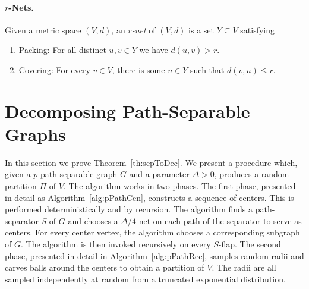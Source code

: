 \documentclass[11pt,fleqn]{article}
\begin{document}
\paragraph{$r$-Nets.} Given a metric space $(V,d)$, an {\em $r$-net} of $(V,d)$ is a set $Y \subseteq V$ satisfying
\begin{enumerate}
	\item Packing: For all distinct $u,v \in Y$ we have $d(u,v)>r$.
	\item Covering: For every $v \in V$, there is some $u \in Y$ such that $d(v,u) \le r$.
\end{enumerate}
\section{Decomposing Path-Separable Graphs}
In this section we prove Theorem~\ref{th:sepToDec}. 
We present a procedure which, given a $p$-path-separable graph $G$ and a parameter $\Delta>0$, produces a random partition $\Pi$ of $V$. 
The algorithm works in two phases. The first phase, presented in detail as Algorithm~\ref{alg:pPathCen}, constructs a sequence of centers.
This is performed deterministically and by recursion. 
The algorithm finds a path-separator $S$ of $G$ and chooses a $\Delta/4$-net on each path of the separator to serve as centers. For every center vertex, the algorithm chooses a corresponding subgraph of $G$. 
The algorithm is then invoked recursively on every $S$-flap.
The second phase, presented in detail in Algorithm~\ref{alg:pPathRec}, samples random radii and carves balls around the centers to obtain a partition of $V$. The radii are all sampled independently at random from a truncated exponential distribution.
\end{document}
